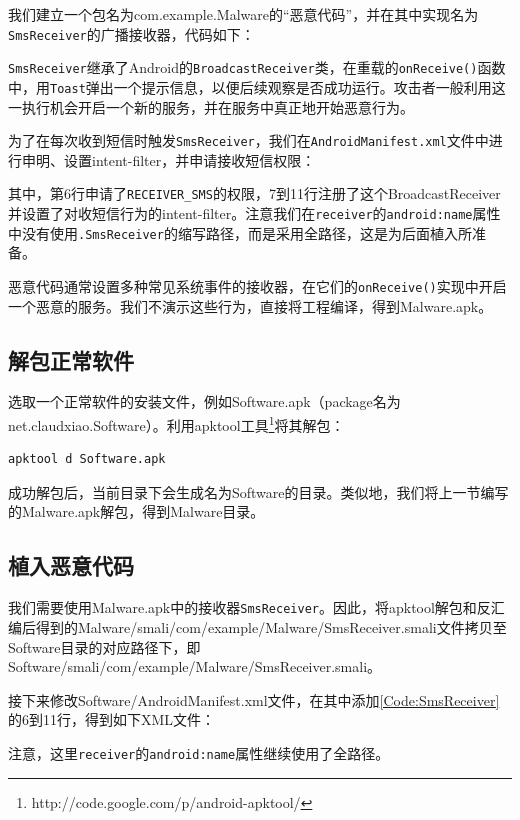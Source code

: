 我们建立一个包名为com.example.Malware的“恶意代码”，并在其中实现名为\lstinline!SmsReceiver!的广播接收器，代码如下：


\lstinline!SmsReceiver!继承了Android的\lstinline!BroadcastReceiver!类，在重载的\lstinline!onReceive()!函数中，用\lstinline!Toast!弹出一个提示信息，以便后续观察是否成功运行。攻击者一般利用这一执行机会开启一个新的服务，并在服务中真正地开始恶意行为。

为了在每次收到短信时触发\lstinline!SmsReceiver!，我们在\lstinline!AndroidManifest.xml!文件中进行申明、设置intent-filter，并申请接收短信权限：

其中，第6行申请了\lstinline!RECEIVER_SMS!的权限，7到11行注册了这个BroadcastReceiver并设置了对收短信行为的intent-filter。注意我们在\lstinline!receiver!的\lstinline!android:name!属性中没有使用\lstinline!.SmsReceiver!的缩写路径，而是采用全路径，这是为后面植入所准备。

恶意代码通常设置多种常见系统事件的接收器，在它们的\lstinline!onReceive()!实现中开启一个恶意的服务。我们不演示这些行为，直接将工程编译，得到Malware.apk。
\subsection{解包正常软件}
选取一个正常软件的安装文件，例如Software.apk（package名为net.claudxiao.Software）。利用apktool工具\footnote{http://code.google.com/p/android-apktool/}将其解包：
\begin{lstlisting}[language=bash, numbers=none]
apktool d Software.apk
\end{lstlisting}
成功解包后，当前目录下会生成名为Software的目录。类似地，我们将上一节编写的Malware.apk解包，得到Malware目录。
\subsection{植入恶意代码}
我们需要使用Malware.apk中的接收器\lstinline!SmsReceiver!。因此，将apktool解包和反汇编后得到的Malware/smali/com/example/Malware/SmsReceiver.smali文件拷贝至Software目录的对应路径下，即Software/smali/com/example/Malware/SmsReceiver.smali。

接下来修改Software/AndroidManifest.xml文件，在其中添加\ref{Code:SmsReceiver}的6到11行，得到如下XML文件：

注意，这里\lstinline!receiver!的\lstinline!android:name!属性继续使用了全路径。
